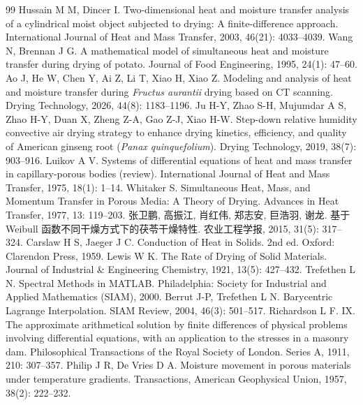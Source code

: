 \documentclass[withoutpreface,bwprint]{cumcmthesis}
\begin{document}
\begin{thebibliography}{99}
\normalsize
\setlength{\itemsep}{1.5pt plus 0.5pt}
\setlength{\parskip}{0pt}
 Hussain M M, Dincer I. Two-dimensional heat and moisture transfer
analysis of a cylindrical moist object subjected to drying: A finite-difference approach.
International Journal of Heat and Mass Transfer, 2003, 46(21): 4033--4039.
 Wang N, Brennan J G. A mathematical model of simultaneous heat and
moisture transfer during drying of potato. Journal of Food Engineering, 1995, 24(1): 47--60.
 Ao J, He W, Chen Y, Ai Z, Li T, Xiao H, Xiao Z. Modeling and
analysis of heat and moisture transfer during \textit{Fructus aurantii} drying based on
CT scanning. Drying Technology, 2026, 44(8): 1183--1196.
 Ju H-Y, Zhao S-H, Mujumdar A S, Zhao H-Y, Duan X, Zheng Z-A,
Gao Z-J, Xiao H-W. Step-down relative humidity convective air drying strategy to enhance
drying kinetics, efficiency, and quality of American ginseng root
(\textit{Panax quinquefolium}). Drying Technology, 2019, 38(7): 903--916.
 Luikov A V. Systems of differential equations of heat and mass transfer
in capillary-porous bodies (review). International Journal of Heat and Mass Transfer,
1975, 18(1): 1--14.
 Whitaker S. Simultaneous Heat, Mass, and Momentum Transfer in Porous
Media: A Theory of Drying. Advances in Heat Transfer, 1977, 13: 119--203.
 张卫鹏, 高振江, 肖红伟, 郑志安, 巨浩羽, 谢龙.
基于 Weibull 函数不同干燥方式下的茯苓干燥特性. 农业工程学报, 2015, 31(5): 317--324.
 Carslaw H S, Jaeger J C. Conduction of Heat in Solids. 2nd ed.
Oxford: Clarendon Press, 1959.
 Lewis W K. The Rate of Drying of Solid Materials.
Journal of Industrial \& Engineering Chemistry, 1921, 13(5): 427--432.
 Trefethen L N. Spectral Methods in MATLAB.
Philadelphia: Society for Industrial and Applied Mathematics (SIAM), 2000.
 Berrut J-P, Trefethen L N. Barycentric Lagrange Interpolation.
SIAM Review, 2004, 46(3): 501--517.
 Richardson L F. IX. The approximate arithmetical solution by finite
differences of physical problems involving differential equations, with an application to
the stresses in a masonry dam. Philosophical Transactions of the Royal Society of London.
Series A, 1911, 210: 307--357.
 Philip J R, De Vries D A. Moisture movement in porous materials under
temperature gradients. Transactions, American Geophysical Union, 1957, 38(2): 222--232.
\end{thebibliography}
\end{document}

